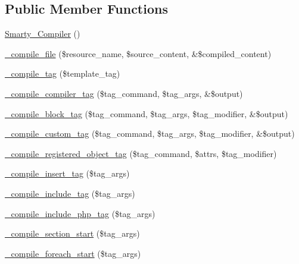\subsection*{Public Member Functions}
\begin{DoxyCompactItemize}
\item 
\mbox{\hyperlink{class_smarty___compiler_a7940bed7199f0d4c7c63d8a07a87bd8c}{Smarty\+\_\+\+Compiler}} ()
\item 
\mbox{\hyperlink{class_smarty___compiler_a00459be8de7cd5876714023939411f10}{\+\_\+compile\+\_\+file}} (\$resource\+\_\+name, \$source\+\_\+content, \&\$compiled\+\_\+content)
\item 
\mbox{\hyperlink{class_smarty___compiler_a2437ad0b38700c2b4b08573566c43c48}{\+\_\+compile\+\_\+tag}} (\$template\+\_\+tag)
\item 
\mbox{\hyperlink{class_smarty___compiler_aad3738a1a92e9a579dd3ab14469386b9}{\+\_\+compile\+\_\+compiler\+\_\+tag}} (\$tag\+\_\+command, \$tag\+\_\+args, \&\$output)
\item 
\mbox{\hyperlink{class_smarty___compiler_ade3e40923ed1ea61b8578831c2767a76}{\+\_\+compile\+\_\+block\+\_\+tag}} (\$tag\+\_\+command, \$tag\+\_\+args, \$tag\+\_\+modifier, \&\$output)
\item 
\mbox{\hyperlink{class_smarty___compiler_a4733e870ed01da5e62d52dde61cf2dec}{\+\_\+compile\+\_\+custom\+\_\+tag}} (\$tag\+\_\+command, \$tag\+\_\+args, \$tag\+\_\+modifier, \&\$output)
\item 
\mbox{\hyperlink{class_smarty___compiler_a4768af997ac7a6ca06b6f426b9bd39cf}{\+\_\+compile\+\_\+registered\+\_\+object\+\_\+tag}} (\$tag\+\_\+command, \$attrs, \$tag\+\_\+modifier)
\item 
\mbox{\hyperlink{class_smarty___compiler_a4a9b22720c848862c5719a116246955d}{\+\_\+compile\+\_\+insert\+\_\+tag}} (\$tag\+\_\+args)
\item 
\mbox{\hyperlink{class_smarty___compiler_a78d8b41387b488cf352e4a638023e5ed}{\+\_\+compile\+\_\+include\+\_\+tag}} (\$tag\+\_\+args)
\item 
\mbox{\hyperlink{class_smarty___compiler_a120c8620070c5417709f16896958c7bc}{\+\_\+compile\+\_\+include\+\_\+php\+\_\+tag}} (\$tag\+\_\+args)
\item 
\mbox{\hyperlink{class_smarty___compiler_ad6c4e3a2309e3354a84fbf2992e78832}{\+\_\+compile\+\_\+section\+\_\+start}} (\$tag\+\_\+args)
\item 
\mbox{\hyperlink{class_smarty___compiler_af4169d507c719a53677048d51f61090d}{\+\_\+compile\+\_\+foreach\+\_\+start}} (\$tag\+\_\+args)

\end{DoxyCompactItemize}
